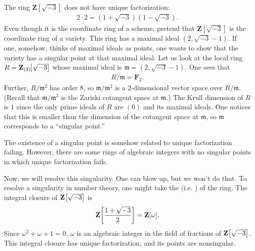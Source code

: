 \documentclass [11 pt, oneside, margin = 1 in] {article}
\begin{document}
\begin{example}[ ]\label{}\text{}
The ring $\mathbf{Z}\!\left[\sqrt{-3}\right]$ does not have unique factorization:
\begin{align*}
	2\cdot 2 = (1+\sqrt{-3} ) (1-\sqrt{-3} ).
\end{align*}
Even though it is the coordinate ring of a scheme, pretend that $\mathbf{Z}\!\left[\sqrt{-3}\right]$ is the coordinate ring of a variety. This ring has a maximal ideal $(2,\sqrt{-3}-1 )$. If one, somehow, thinks of maximal ideals as points, one wants to show that the variety has a singular point at that maximal ideal. Let us look at the local ring $R=\mathbf Z_{(2)} \!\!\left[ \sqrt{-3}  \right] $ whose maximal ideal is $\mathfrak{m}=(2,\sqrt{-3}-1 )$. One sees that \begin{align*}
	R/\mathfrak{m} = \mathbf{F}_{2}.
\end{align*}
Further, $R/\mathfrak{m}^2$ has order $8$, so $\mathfrak{m}/\mathfrak{m}^2$ is a $2$-dimensional vector space over $R/\mathfrak{m}$. (Recall that $\mathfrak{m}/\mathfrak{m}^2$ is the Zariski cotangent space at $\mathfrak{m}$.) The Krull dimension of $R$ is $1$ since the only prime ideals of $R$ are $(0)$ and its maximal ideals. One notices that this is smaller than the dimension of the cotangent space at $\mathfrak{m}$, so $\mathfrak{m}$ corresponds to a ``singular point.''

\begin{remark}
	The existence of a singular point is somehow related to unique factorization failing. However, there are some rings of algebraic integers with no singular points in which unique factorization fails. 
\end{remark}

Now, we will resolve this singularity. One can blow up, but we won't do that. To resolve a singularity in number theory, one might take the  (i.e. ) of the ring. The integral closure of $\mathbf Z\!\left[ \sqrt{-3}  \right] $ is
\begin{align*}
	\mathbf Z \!\left[ \frac{1+\sqrt{-3} }{2} \right] = \mathbf Z[\omega] .
\end{align*}
Since $\omega^2+\omega+1=0$, $\omega$ is an algebraic integer in the field of fractions of $\mathbf Z\!\left[ \sqrt{-3}  \right] $. This integral closure has unique factorization, and its points are nonsingular.
\end{example}
\end{document}
